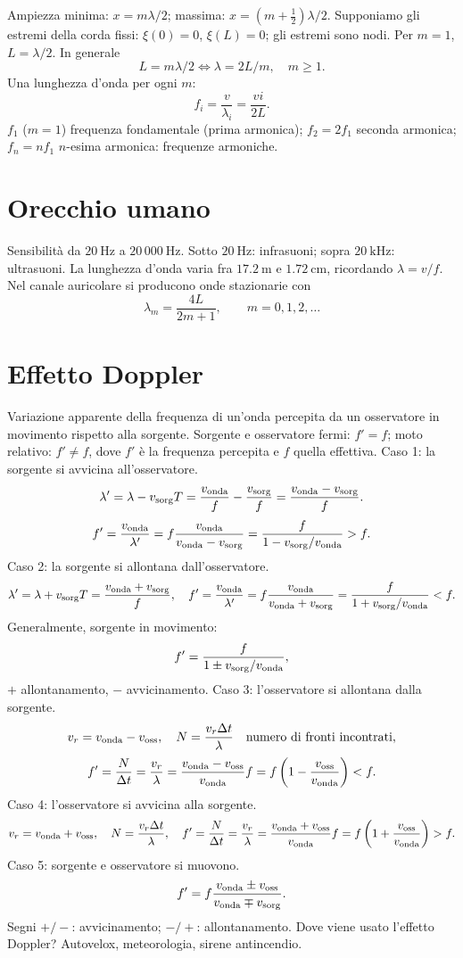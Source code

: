 \documentclass[11pt,a4paper]{article}
\newcommand{\pagina}[1]{\clearpage}
\begin{document}
Ampiezza minima: $x=m\lambda/2$; massima: $x=(m+\tfrac12)\lambda/2$.
Supponiamo gli estremi della corda fissi: $\xi(0)=0$, $\xi(L)=0$; gli estremi sono nodi.
Per $m=1$, $L=\lambda/2$. In generale
\[L=m\lambda/2\iff\lambda=2L/m,\quad m\ge1.\]
Una lunghezza d'onda per ogni $m$:
\[f_i=\frac v{\lambda_i}=\frac{vi}{2L}.\]
$f_1$ ($m=1$) frequenza fondamentale (prima armonica); $f_2=2f_1$ seconda armonica; $f_n=nf_1$ $n$-esima armonica: frequenze armoniche.
\pagina{14}\section*{Orecchio umano}
Sensibilità da $20\ \mathrm{Hz}$ a $20\,000\ \mathrm{Hz}$. Sotto $20\ \mathrm{Hz}$: infrasuoni; sopra $20\ \mathrm{kHz}$: ultrasuoni.
La lunghezza d'onda varia fra $17.2\ \mathrm m$ e $1.72\ \mathrm{cm}$, ricordando $\lambda=v/f$.
Nel canale auricolare si producono onde stazionarie con
\[\lambda_m=\frac{4L}{2m+1},\qquad m=0,1,2,\ldots\]
\section*{Effetto Doppler}
Variazione apparente della frequenza di un'onda percepita da un osservatore in movimento rispetto alla sorgente.
Sorgente e osservatore fermi: $f'=f$; moto relativo: $f'\ne f$, dove $f'$ è la frequenza percepita e $f$ quella effettiva.
Caso 1: la sorgente si avvicina all'osservatore.
\[\lambda'=\lambda-v_{\rm sorg}T=\frac{v_{\rm onda}}f-\frac{v_{\rm sorg}}f=\frac{v_{\rm onda}-v_{\rm sorg}}f.\]
\[f'=\frac{v_{\rm onda}}{\lambda'}=f\frac{v_{\rm onda}}{v_{\rm onda}-v_{\rm sorg}}=\frac f{1-v_{\rm sorg}/v_{\rm onda}}>f.\]
\pagina{15}
Caso 2: la sorgente si allontana dall'osservatore.
\[\lambda'=\lambda+v_{\rm sorg}T=\frac{v_{\rm onda}+v_{\rm sorg}}f,\quad f'=\frac{v_{\rm onda}}{\lambda'}=f\frac{v_{\rm onda}}{v_{\rm onda}+v_{\rm sorg}}=\frac f{1+v_{\rm sorg}/v_{\rm onda}}<f.\]
Generalmente, sorgente in movimento:
\[f'=\frac f{1\pm v_{\rm sorg}/v_{\rm onda}},\]
$+$ allontanamento, $-$ avvicinamento.
Caso 3: l'osservatore si allontana dalla sorgente.
\[v_r=v_{\rm onda}-v_{\rm oss},\quad N=\frac{v_r\Delta t}\lambda\quad\text{numero di fronti incontrati},\]
\[f'=\frac N{\Delta t}=\frac{v_r}\lambda=\frac{v_{\rm onda}-v_{\rm oss}}{v_{\rm onda}}f=f\left(1-\frac{v_{\rm oss}}{v_{\rm onda}}\right)<f.\]
Caso 4: l'osservatore si avvicina alla sorgente.
\[v_r=v_{\rm onda}+v_{\rm oss},\quad N=\frac{v_r\Delta t}\lambda,\quad f'=\frac N{\Delta t}=\frac{v_r}\lambda=\frac{v_{\rm onda}+v_{\rm oss}}{v_{\rm onda}}f=f\left(1+\frac{v_{\rm oss}}{v_{\rm onda}}\right)>f.\]
\pagina{16}
Caso 5: sorgente e osservatore si muovono.
\[f'=f\frac{v_{\rm onda}\pm v_{\rm oss}}{v_{\rm onda}\mp v_{\rm sorg}}.\]
Segni $+/-$: avvicinamento; $-/+$: allontanamento.
Dove viene usato l'effetto Doppler? Autovelox, meteorologia, sirene antincendio.
\end{document}
